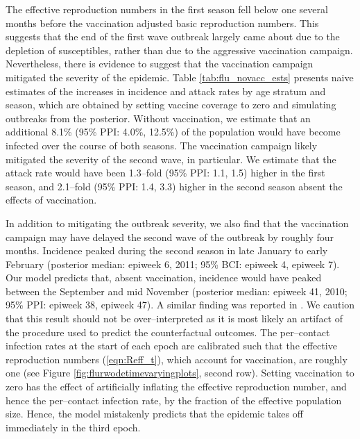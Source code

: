 The effective reproduction numbers in the first season fell below one several months before the vaccination adjusted basic reproduction numbers. This suggests that the end of the first wave outbreak largely came about due to the depletion of susceptibles, rather than due to the aggressive vaccination campaign. Nevertheless, there is evidence to suggest that the vaccination campaign mitigated the severity of the epidemic. Table \ref{tab:flu_novacc_ests} presents naive estimates of the increases in incidence and attack rates by age stratum and season, which are obtained by setting vaccine coverage to zero and simulating outbreaks from the posterior. Without vaccination, we estimate that an additional 8.1\% (95\% PPI: 4.0\%, 12.5\%) of the population would have become infected over the course of both seasons. The vaccination campaign likely mitigated the severity of the second wave, in particular. We estimate that the attack rate would have been 1.3--fold (95\% PPI: 1.1, 1.5) higher in the first season, and 2.1--fold (95\% PPI: 1.4, 3.3) higher in the second season absent the effects of vaccination. 

In addition to mitigating the outbreak severity, we also find that the vaccination campaign may have delayed the second wave of the outbreak by roughly four months. Incidence peaked during the second season in late January to early February (posterior median: epiweek 6, 2011; 95\% BCI: epiweek 4, epiweek 7). Our model predicts that, absent vaccination, incidence would have peaked between the September and mid November (posterior median: epiweek 41, 2010; 95\% PPI: epiweek 38, epiweek 47). A similar finding was reported in \cite{shubin2016revealing}. We caution that this result should not be over--interpreted as it is most likely an artifact of the procedure used to predict the counterfactual outcomes. The per--contact infection rates at the start of each epoch are calibrated such that the effective reproduction numbers (\ref{eqn:Reff_t}), which account for vaccination, are roughly one (see Figure \ref{fig:flurwodetimevaryingplots}, second row). Setting vaccination to zero has the effect of artificially inflating the effective reproduction number, and hence the per--contact infection rate, by the fraction of the effective population size. Hence, the model mistakenly predicts that the epidemic takes off immediately in the third epoch.

